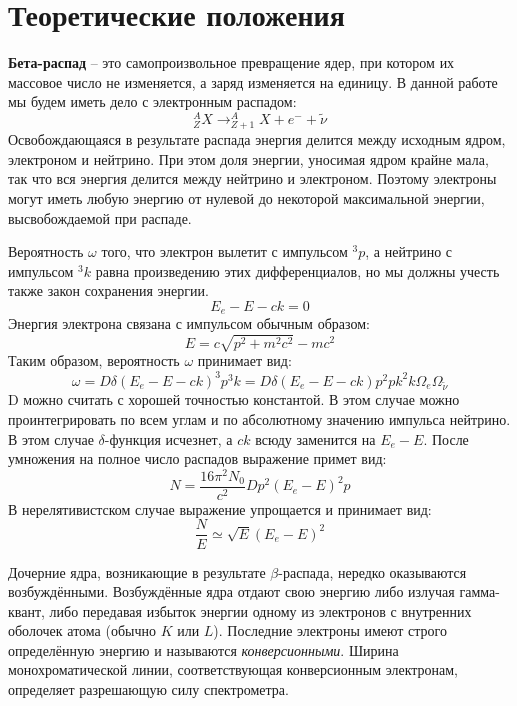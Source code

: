 \documentclass[15pt,a5paper,reqno]{article}
\begin{document}
\section{Теоретические положения}

\textbf{Бета-распад} --  это самопроизвольное превращение ядер, при котором их массовое число не изменяется, а заряд изменяется на единицу. В данной работе мы будем иметь дело с электронным распадом:
		\begin{equation}
		    _{Z}^{A}X \rightarrow _{Z+1}^{A}X + e^{-} + \widetilde{\nu}
		\end{equation}
		Освобождающаяся в результате распада энергия делится между исходным ядром, электроном и нейтрино. При этом доля энергии, уносимая ядром крайне мала, так что вся энергия делится между нейтрино и электроном. Поэтому электроны могут иметь любую энергию от нулевой до некоторой максимальной энергии, высвобождаемой при распаде.
		
		Вероятность $\omega$ того, что электрон вылетит с импульсом $^3p$, а нейтрино с импульсом $^3k$ равна произведению этих дифференциалов, но мы должны учесть также закон сохранения энергии.
		\begin{equation}
		    E_e - E - ck = 0
		\end{equation}
		Энергия электрона связана с импульсом обычным образом:
		\begin{equation}
		    E = c\sqrt{p^2 + m^2c^2} -mc^2
		\end{equation}
		Таким образом, вероятность $\omega$ принимает вид:
		\begin{equation}
		    \omega = D\delta(E_e-E-ck)^3p^3k = D\delta(E_e-E-ck)p^2 pk^2 k\Omega_e\Omega_{\widetilde{\nu}}
		\end{equation}
		D можно считать с хорошей точностью константой. В этом случае можно проинтегрировать по всем углам и по абсолютному значению импульса нейтрино. В этом случае $\delta$-функция исчезнет, а $ck$ всюду заменится на $E_e-E$. После умножения на полное число распадов выражение примет вид:
		\begin{equation}
		     N = \frac{16\pi^2N_0}{c^2} D p^2\left(E_e-E\right)^2 p
		\end{equation}
		В нерелятивистском случае выражение упрощается и принимает вид:
		\begin{equation}
			\frac{ N}{ E} \simeq \sqrt{E}(E_e - E)^2
		\end{equation}
		
		Дочерние ядра, возникающие в результате $\beta$-распада, нередко оказываются возбуждёнными. Возбуждённые ядра отдают свою энергию либо излучая гамма-квант, либо передавая избыток энергии одному из электронов с внутренних оболочек атома (обычно $K$ или $L$). Последние электроны имеют строго определённую энергию и называются \textit{конверсионными}. Ширина монохроматической линии, соответствующая конверсионным электронам, определяет разрешающую силу спектрометра.
\end{document}
